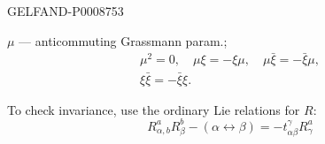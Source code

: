 \begin{GelfandAdjacentEvidence}{GELFAND-P000875}{3}


$\mu$ --- anticommuting Grassmann param.;
\begin{equation*}
\begin{gathered}
\mu^2=0,\quad\mu\xi=-\xi\mu,\quad\mu\bar\xi=-\bar\xi\mu,\\
\xi\bar\xi=-\bar\xi\xi.
\end{gathered}
\tag{44}
\end{equation*}

To check invariance, use the ordinary Lie relations for $R$:
\begin{equation*}
R_{\alpha,b}^aR_\beta^b-(\alpha\leftrightarrow\beta)=-t^\gamma_{\alpha\beta}R_\gamma^a
\tag{45}
\end{equation*}
\end{GelfandAdjacentEvidence}



